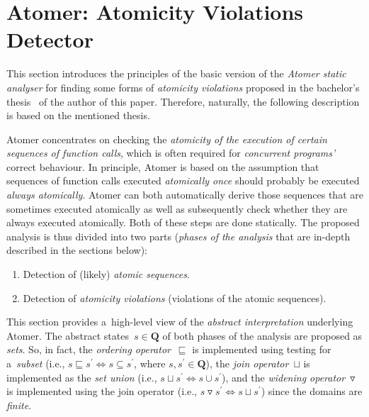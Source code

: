 \documentclass{ExcelAtFIT}
\theoremstyle{example}
\begin{document}
\section{\hspace{-.15em}Atomer: Atomicity Violations Detector}
\label{sec:atomer}

This section introduces the principles of the basic version of the \emph{Atomer static analyser} for finding some forms of \emph{atomicity violations} proposed in the bachelor's thesis~\cite{harmimBP} of the author of this paper. Therefore, naturally, the following description is based on the mentioned thesis.

Atomer concentrates on checking the \emph{atomicity of the execution of certain sequences of function calls}, which is often required for \emph{concurrent programs'} correct behaviour. In principle, Atomer is based on the assumption that sequences of function calls executed \emph{atomically once} should probably be executed \emph{always atomically}. Atomer can both automatically derive those sequences that are sometimes executed atomically as well as subsequently check whether they are always executed atomically. Both of these steps are done statically. The proposed analysis is thus divided into two parts (\emph{phases of the analysis} that are in-depth described in the sections below):
\begin{enumerate}[label={\textbf{Phase~\arabic*}:}, leftmargin=4.2em]
    \item Detection of (likely) \emph{atomic sequences}.

    \item Detection of \emph{atomicity violations} (violations of the atomic sequences).
\end{enumerate}

This section provides a~high-level view of the \emph{abstract interpretation} underlying Atomer. The abstract states~$ s \in \boldsymbol{Q} $ of both phases of the analysis are proposed as \emph{sets}. So, in fact, the \emph{ordering operator}~$ \sqsubseteq $ is implemented using testing for a~\emph{subset} (i.e., $ s \sqsubseteq s^\prime \Leftrightarrow s \subseteq s^\prime $, where $ s, s^\prime \in \boldsymbol{Q} $), the \emph{join operator}~$ \sqcup $ is implemented as the \emph{set union} (i.e., $ s \sqcup s^\prime \Leftrightarrow s \cup s^\prime $), and the \emph{widening operator}~$ \triangledown $ is implemented using the join operator (i.e., $ s \triangledown s^\prime \Leftrightarrow s \sqcup s^\prime $) since the domains are \emph{finite}.
\end{document}
